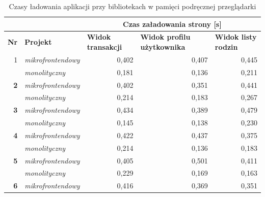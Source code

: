 \documentclass{SGGW-thesis}
\begin{document}
{    \vfill

    \begin{table}[]
      \centering
      \caption{Czasy ładowania aplikacji przy bibliotekach w pamięci podręcznej przeglądarki}
      \begin{tabular}{ll|rrr|}
      \cline{3-5}
       &  & \multicolumn{3}{c|}{\textbf{Czas załadowania strony {[}s{]}}} \\ \hline
      \multicolumn{1}{|l|}{\textbf{Nr}} & \textbf{Projekt} & \multicolumn{1}{l|}{\textbf{Widok transakcji}} & \multicolumn{1}{l|}{\textbf{Widok profilu użytkownika}} & \multicolumn{1}{l|}{\textbf{Widok listy rodzin}} \\ \hline
      \multicolumn{1}{|r|}{1} & \textit{mikrofrontendowy} & \multicolumn{1}{r|}{0,402} & \multicolumn{1}{r|}{0,407} & 0,445 \\ \hline
      \multicolumn{1}{|l|}{\textbf{}} & \textit{monolityczny} & \multicolumn{1}{r|}{0,181} & \multicolumn{1}{r|}{0,136} & 0,211 \\ \hline
      \multicolumn{1}{|r|}{\textbf{2}} & \textit{mikrofrontendowy} & \multicolumn{1}{r|}{0,402} & \multicolumn{1}{r|}{0,351} & 0,441 \\ \hline
      \multicolumn{1}{|l|}{\textbf{}} & \textit{monolityczny} & \multicolumn{1}{r|}{0,214} & \multicolumn{1}{r|}{0,183} & 0,267 \\ \hline
      \multicolumn{1}{|r|}{\textbf{3}} & \textit{mikrofrontendowy} & \multicolumn{1}{r|}{0,434} & \multicolumn{1}{r|}{0,389} & 0,479 \\ \hline
      \multicolumn{1}{|l|}{\textbf{}} & \textit{monolityczny} & \multicolumn{1}{r|}{0,145} & \multicolumn{1}{r|}{0,138} & 0,230 \\ \hline
      \multicolumn{1}{|r|}{\textbf{4}} & \textit{mikrofrontendowy} & \multicolumn{1}{r|}{0,422} & \multicolumn{1}{r|}{0,437} & 0,375 \\ \hline
      \multicolumn{1}{|l|}{\textbf{}} & \textit{monolityczny} & \multicolumn{1}{r|}{0,214} & \multicolumn{1}{r|}{0,136} & 0,183 \\ \hline
      \multicolumn{1}{|r|}{\textbf{5}} & \textit{mikrofrontendowy} & \multicolumn{1}{r|}{0,405} & \multicolumn{1}{r|}{0,501} & 0,411 \\ \hline
      \multicolumn{1}{|l|}{\textbf{}} & \textit{monolityczny} & \multicolumn{1}{r|}{0,229} & \multicolumn{1}{r|}{0,169} & 0,163 \\ \hline
      \multicolumn{1}{|r|}{\textbf{6}} & \textit{mikrofrontendowy} & \multicolumn{1}{r|}{0,416} & \multicolumn{1}{r|}{0,369} & 0,351 \\ \hline

\end{tabular}
\end{table}}
\end{document}
